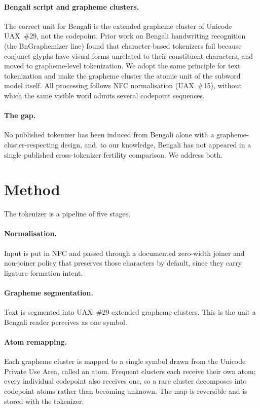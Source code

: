 \documentclass[11pt]{article}
\begin{document}
\paragraph{Bengali script and grapheme clusters.} The correct unit for Bengali is
the extended grapheme cluster of Unicode UAX~\#29, not the codepoint. Prior work
on Bengali handwriting recognition (the BnGraphemizer line) found that
character-based tokenizers fail because conjunct glyphs have visual forms
unrelated to their constituent characters, and moved to grapheme-level
tokenization. We adopt the same principle for text tokenization and make the
grapheme cluster the atomic unit of the subword model itself. All processing
follows NFC normalisation (UAX~\#15), without which the same visible word admits
several codepoint sequences.

\paragraph{The gap.} No published tokenizer has been induced from Bengali alone
with a grapheme-cluster-respecting design, and, to our knowledge, Bengali has not
appeared in a single published cross-tokenizer fertility comparison. We address
both.

\section{Method}
The tokenizer is a pipeline of five stages.

\paragraph{Normalisation.} Input is put in NFC and passed through a documented
zero-width joiner and non-joiner policy that preserves those characters by
default, since they carry ligature-formation intent.

\paragraph{Grapheme segmentation.} Text is segmented into UAX~\#29 extended
grapheme clusters. This is the unit a Bengali reader perceives as one symbol.

\paragraph{Atom remapping.} Each grapheme cluster is mapped to a single symbol
drawn from the Unicode Private Use Area, called an atom. Frequent clusters each
receive their own atom; every individual codepoint also receives one, so a rare
cluster decomposes into codepoint atoms rather than becoming unknown. The map is
reversible and is stored with the tokenizer.
\end{document}
